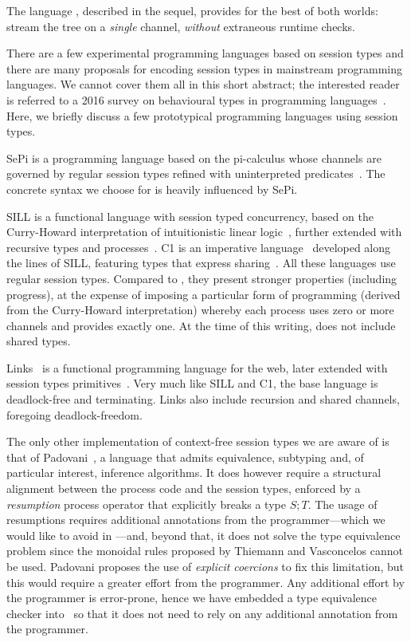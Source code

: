 The language \freest, described in the sequel, provides for the best
of both worlds: stream the tree on a \emph{single} channel,
\emph{without} extraneous runtime checks.


There are a few experimental programming languages based on session
types and there are many proposals for encoding session types in
mainstream programming languages. We cannot cover them all in
this short abstract; the interested reader is referred to a 2016
survey on behavioural types in programming
languages~\cite{DBLP:journals/ftpl/AnconaBB0CDGGGH16}.  Here, we briefly
discuss a few prototypical programming languages using session types.

SePi is a programming language based on the pi-calculus whose channels
are governed by regular session types refined with uninterpreted
predicates~\cite{DBLP:conf/sefm/FrancoV13}. The concrete syntax we
choose for \freest{} is heavily influenced by SePi.

SILL is a functional language with session typed concurrency, based on
the Curry-Howard interpretation of intuitionistic linear
logic~\cite{DBLP:conf/concur/CairesP10}, further extended with
recursive types and
processes~\cite{Toninho:phd,DBLP:conf/esop/ToninhoCP13}.
%
C1 is an imperative language~\cite{Pfenning:C1} developed along the
lines of SILL, featuring types that express
sharing~\cite{DBLP:journals/pacmpl/BalzerP17}.
%
All these languages use regular session types. Compared to \freest,
they present stronger properties (including progress), at the expense
of imposing a particular form of programming (derived from the
Curry-Howard interpretation) whereby each process uses zero or more
channels and provides exactly one. At the time of this writing,
\freest{} does not include shared types.

Links~\cite{DBLP:conf/fmco/CooperLWY06} is a functional programming
language for the web, later extended with session types
primitives~\cite{Lindley.Morris_Lightweight.functional.session.types}. Very
much like SILL and C1, the base language is deadlock-free and
terminating. Links also include recursion and shared channels,
foregoing deadlock-freedom.

The only other implementation of context-free session types we are
aware of is that of Padovani~\cite{DBLP:conf/esop/Padovani17}, a
language that admits equivalence, subtyping and, of particular
interest, inference algorithms. It does however require a structural
alignment between the process code and the session types, enforced by
a \emph{resumption} process operator that explicitly breaks a type
$S;T$. The usage of resumptions requires additional annotations
from the programmer---which we would like to avoid in 
\freest---and, beyond that, it does not solve the type equivalence
problem since the monoidal rules proposed by Thiemann and
Vasconcelos cannot be used. Padovani proposes the use of 
\emph{explicit coercions} to fix this limitation, but this
would require a greater effort from the programmer. 
Any additional effort by the programmer is error-prone, hence
we have embedded a type equivalence checker into  
\freest\ so that it does not need to rely on any
additional annotation from the programmer.


